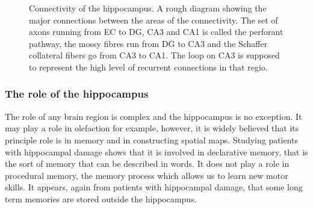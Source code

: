 \documentclass[12pt]{article}
\begin{document}
\begin{figure}
\caption{Connectivity of the hippocampus. A rough diagram showing the
  major connections between the areas of the connectivity. The set of
  axons running from EC to DG, CA3 and CA1 is called the perforant
  pathway, the mossy fibres run from DG to CA3 and the Schaffer
  collateral fibers go from CA3 to CA1. The loop on CA3 is supposed to
  represent the high level of recurrent connections in that
  regio.\label{fig:connectivity}}
\end{figure}

\subsubsection*{The role of the hippocampus}
The role of any brain region is complex and the hippocampus is no
exception. It may play a role in olefaction for example, however, it
is widely believed that its principle role is in memory and in
constructing spatial maps. Studying patients with hippocampal damage
shows that it is involved in declarative memory, that is the sort of
memory that can be described in words. It does not play a role in
procedural memory, the memory process which allows us to learn new
motor skills. It appears, again from patients with hippocampal damage,
that some long term memories are stored outside the hippocampus.
\end{document}

